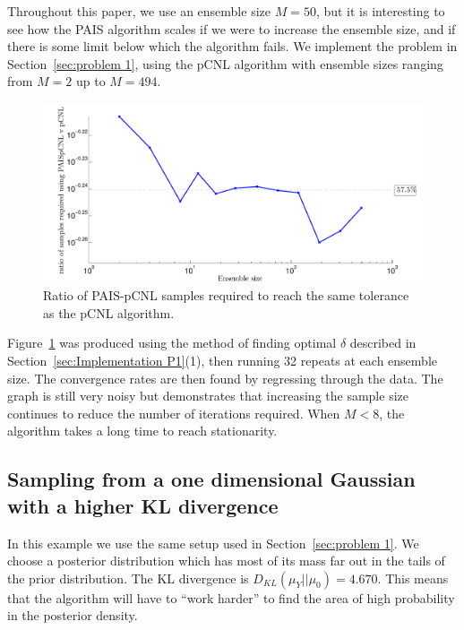 \documentclass[final]{siamltex}
\begin{document}
Throughout this paper, we use an ensemble size $M=50$, but it is interesting to see how the PAIS algorithm scales if we were to increase the ensemble size, and if there is some limit below which the algorithm fails. We implement the problem in Section~\ref{sec:problem 1}, using the pCNL algorithm with ensemble sizes ranging from $M=2$ up to $M=494$.

\begin{figure}[h]
\begin{center}
\includegraphics[width=\textwidth]{"figures/PAIS_saving"}
\caption{Ratio of PAIS-pCNL samples required to reach the same tolerance as the pCNL algorithm.}
\label{fig:PAIS_saving}
\end{center}
\end{figure}

Figure~\ref{fig:PAIS_saving} was produced using the method of finding optimal $\delta$ described in Section~\ref{sec:Implementation P1}(1), then running 32 repeats at each ensemble size. The convergence rates are then found by regressing through the data. The graph is still very noisy but demonstrates that increasing the sample size continues to reduce the number of iterations required. When $M<8$, the algorithm takes a long time to reach stationarity.

\subsection{Sampling from a one dimensional Gaussian with a higher KL divergence}\label{sec:problem 2}

In this example we use the same setup used in Section~\ref{sec:problem 1}. We choose a posterior distribution which has most of its mass far out in the tails of the prior distribution. The KL divergence is $D_{KL}(\mu_Y||\mu_0) = 4.670$. This means that the algorithm will have to ``work harder'' to find the area of high probability in the posterior density.
\end{document}
